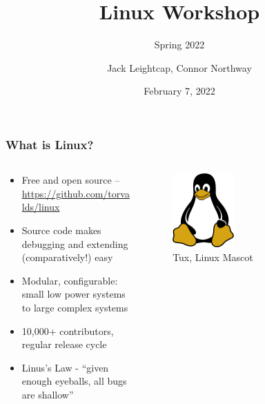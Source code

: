 \documentclass{beamer} \usetheme{Madrid}
\title{Linux Workshop}
\subtitle{Spring 2022}
\author[]{Jack Leightcap\inst{1}\inst{2}, Connor Northway\inst{2}}
\institute[IEEE, Wireless Club]{
    \inst{1}IEEE -- \url{nuieeeofficers@gmail.com}
    \and
    \inst{2}Wireless Club -- \url{nuwirelessclub@gmail.com}
}
\date[Spring 2022]{February 7, 2022}
\begin{document}
\frame{\titlepage}

\begin{frame}
    \frametitle{What is Linux?}
    \begin{columns}
        \begin{column}{0.6\textwidth}
            \begin{itemize}
                \item Free and open source -- \url{https://github.com/torvalds/linux}
                \item Source code makes debugging and extending (comparatively!) easy
                \item Modular, configurable: small low power systems to large complex systems
                \item 10,000+ contributors, regular release cycle
                \item Linus's Law - ``given enough eyeballs, all bugs are shallow''
            \end{itemize}
        \end{column}
        \begin{column}{0.4\textwidth}
            \centering
            \begin{figure}
                \includegraphics[width=0.4\textwidth]{tux.png}
                \caption{Tux, Linux Mascot}
            \end{figure}
        \end{column}
    \end{columns}
\end{frame}
\end{document}
